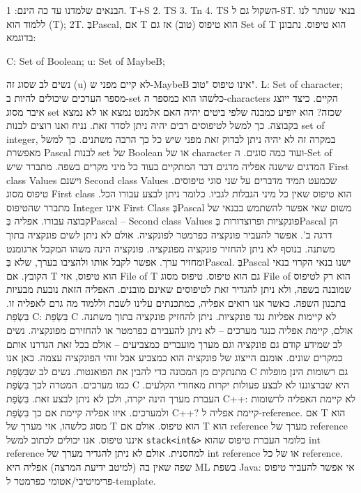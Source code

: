       הבנאים שלמדנו עד כה הינם:
      1. T+S
      2. TS
      3. Tn
      4. TS השקול גם ל-ST.
      בנאי שנותר לנו ללמוד הוא (T); 2T.
      בְּPascal, אם T הוא טיפוס (טוב) אז גם Set of T הוא טיפוס.
      נתבונן בדוגמא:

      C: Set of Boolean;
      u: Set of MaybeB;

      נשים לב שסוג זה (u) לא קיים מפני ש-MaybeB אינו טיפוס "טוב".
      L: Set of character;
      מספר הערכים שיכולים להיות ב-set כלשהו הוא כמספר ה-characters הקיים.
      כיצד ייוצג איבר מסוג set שכזה? הוא יופיע כמבנה שלפי ביטים יהיה האם אלמנט נמצא או לא נמצא בקבוצה.
      כך למשל לטיפוסים רבים יהיה ניתן לסדר זאת.
      נניח ואנו רוצים לבנות set of integer, במקרה זה לא יהיה ניתן לבדוק זאת מפני שיש כל כך הרבה משתנים.
      כך למשל מאפשרת Pascal לבנות set של Boolean או של character ועוד כמה סוגים.
      ה-Set of המדגים שישנה אפליה מדגים דבר המתקיים בעוד כל מיני מקרים בשפה.
      מתברר שיש First class Values וישנם Second class Values שכמעט תמיד מדברים על שני סוגי טיפוסים.
      טיפוס מסוג First class הוא טיפוס שאין כל מיני הגבלות לגביו. כלומר ניתן לבצע עבורו הכל.
      מתברר שהטיפוס Integer אינו First Class בְּPascal משום שאי אפשר להשתמש בבנאי של קבוצה עבורו.
      אפליה בְּPascal – Second class Values פונקציות ופרוצדורות בְּPascal הן דרגה ב'. אפשר להעביר פונקציה כפרמטר לפונקציה. אולם לא ניתן לשים פונקציה בתוך משתנה. בנוסף לא ניתן להחזיר פונקציה מפונקציה.
      פונקציה הינה משהו המקבל ארגומנט ומחזיר ערך. אפשר לקבל אותו ולהציבו בערך, שלא בְּPascal.
      בְּPascal ישנו בנאי הקרוי בנאי הקובץ. אם T הוא טיפוס, אזי File of T גם הוא טיפוס. טיפוס מסוג File of הוא רק לטיפוס שמובנה בשפה, ולא ניתן להגדיר זאת לטיפוסים שאינם מובנים. האפליה הזאת נובעת מבעיות בתכנון השפה.
      כאשר אנו רואים אפליה, כמתכנתים עלינו לשבת וללמוד מה גרם לאפליה זו.
      בִּשְׂפַת C:
      בִּשְׂפַת C לא קיימות אפליות נגד פונקציות. ניתן להחזיק פונקציה בתוך משתנה.
      אולם, קיימת אפליה כנגד מערכים – לא ניתן להעבירם כפרמטר או להחזירם מפונקציה.
      נשים לב שמידע קודם גם פונקציה וגם מערך מועברים כמצביעים – אולם בכל זאת הגדרנו אותם כמקרים שונים. אומנם הייצוג של פונקציה הוא כמצביע אבל זוהי הפונקציה עצמה. כאן אנו מתנתקים מן המכונה כדי להבין את הפואנטות.
      נשים לב שבִּשְׂפַת C גם רשומות הינן מופלות כמו מערכים.
      המטרה לכך בִּשְׂפַת C היא שברצוננו לא לבצע פעולות יקרות מאחורי הקלעים. העברת מערך הינה יקרה, ולכן לא ניתן לבצע זאת.
      בִּשְׂפַת C++:
      לא קיימת האפליה לרשומות ולמערכים. איזו אפליה קיימת אם כך בִּשְׂפַת C++? קיימת אפליה ל-reference.
      אם T הוא מסוג כלשהו, אזי מערך של T הוא טיפוס. אולם אם T הוא reference מערך של reference איננו טיפוס.
      אנו יכולים לכתוב למשל \verb+stack<int&>+ כלומר העברת טיפוס שהוא int reference למחסנית. אולם לא ניתן להגדיר מערך של int reference או של כל reference.
      שפה שאין בה (למיטב ידיעת המרצה) אפליה היא ML
      בשפת Java:
      אי אפשר להעביר טיפוס פרימיטיבי/אטומי כפרמטר ל-template.

